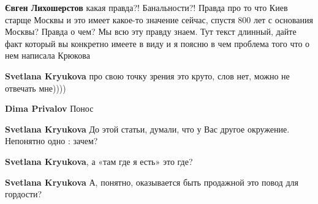 \begin{itemize}
\begin{itemize}
\textbf{Євген Лихошерстов} какая правда?! Банальности?! Правда про то что Киев старще Москвы и это имеет какое-то значение сейчас, спустя 800 лет с основания Москвы? Правда о чем?
Мы всю эту правду знаем. Тут текст длинный, дайте факт который вы конкретно имеете в виду и я поясню в чем проблема того что о нем написала Крюкова

 
\textbf{Svetlana Kryukova} про свою точку зрения это круто, слов нет, можно не отвечать мне))))

 
\textbf{Dima Privalov} Понос

 
\textbf{Svetlana Kryukova} До этой статьи, думали, что у Вас другое окружение. Непонятно одно : зачем?

 
\textbf{Svetlana Kryukova}, а «там где я есть» это где?

 
\textbf{Svetlana Kryukova} А, понятно, оказывается быть продажной это повод для гордости?

\end{itemize}

\end{itemize}


